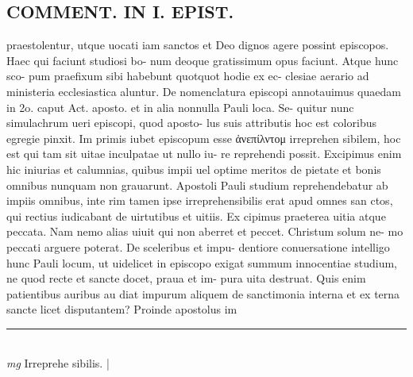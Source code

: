 \documentclass{article}
\begin{document}
\begin{pages}
\section*{COMMENT. IN I. EPIST. }\pstart praestolentur, utque uocati iam sanctos et Deo dignos agere possint episcopos. Haec qui faciunt studiosi bo- num deoque gratissimum opus faciunt. Atque hunc sco- pum praefixum sibi habebunt quotquot hodie ex ec- clesiae aerario ad ministeria ecclesiastica aluntur. De nomenclatura episcopi annotauimus quaedam in 2o. caput Act. aposto. et in alia nonnulla Pauli loca. Se- quitur nunc simulachrum ueri episcopi, quod aposto- lus suis attributis hoc est coloribus egregie pinxit. Im primis iubet episcopum esse ἀνεπίλντομ irreprehen sibilem, hoc est qui tam sit uitae inculpatae ut nullo iu- re reprehendi possit. Excipimus enim hic iniurias et calumnias, quibus impii uel optime meritos de pietate et bonis omnibus nunquam non grauarunt. Apostoli Pauli studium reprehendebatur ab impiis omnibus, inte rim tamen ipse irreprehensibilis erat apud omnes san ctos, qui rectius iudicabant de uirtutibus et uitiis. Ex cipimus praeterea uitia atque peccata. Nam nemo alias uiuit qui non aberret et peccet. Christum solum ne- mo peccati arguere poterat. De sceleribus et impu- dentiore conuersatione intelligo hunc Pauli locum, ut uidelicet in episcopo exigat summum innocentiae studium, ne quod recte et sancte docet, praua et im- pura uita destruat. Quis enim patientibus auribus au diat impurum aliquem de sanctimonia interna et ex terna sancte licet disputantem? Proinde apostolus im  \pend
\vspace{0.5cm}\noindent
\vspace{0.2cm}\rule{1cm}{0.2pt}\\ 
\hspace{0.2cm}\textit{mg}
\footnotesize Irreprehe sibilis. 
\normalsize| 

\end{pages}
\end{document}
